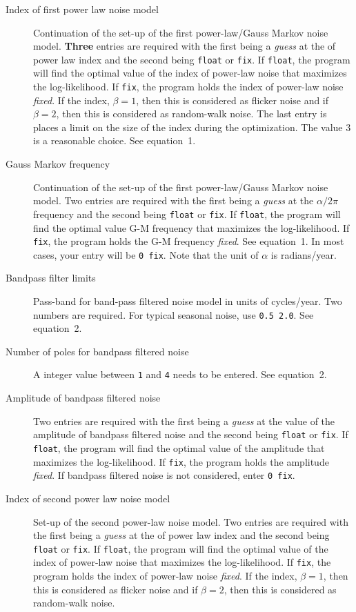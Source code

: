 \documentclass[12pt]{amsart}
\begin{document}
\begin{description}
\item[Index of first power law noise model] Continuation of the set-up of the first power-law/Gauss Markov noise model.
\textbf{Three} entries are required
with the first being a \textit{guess} at the of power law index and the second being \texttt{float} or \texttt{fix}.
If \texttt{float}, the program will find the optimal value of the index of power-law noise that maximizes the log-likelihood. If \texttt{fix},
the program holds the index of power-law noise \textit{fixed}.  If the index, $\beta=1$, then this is considered
as flicker noise and if $\beta=2$, then this is considered
as random-walk noise.  The last entry is places a limit on the size of the index during the optimization. The value
$3$ is a reasonable choice. See equation~1.

\item[Gauss Markov frequency] Continuation of the set-up of the first power-law/Gauss Markov noise model.
Two entries are required
with the first being a \textit{guess} at the ${\alpha}/{2{\pi}}$ frequency and the second being \texttt{float} or \texttt{fix}.
If \texttt{float}, the program will find the optimal value G-M frequency that maximizes the log-likelihood. If \texttt{fix},
the program holds the G-M frequency \textit{fixed}.   See equation~1. In most cases, your entry will be \texttt{0 fix}.
Note that the unit of ${\alpha}$ is radians/year.

\item[Bandpass filter limits] Pass-band for band-pass filtered noise model in units of cycles/year. Two numbers are
required. For typical seasonal noise, use \texttt{0.5 2.0}.  See equation~2.

\item[Number of poles for bandpass filtered noise] A integer value between \texttt{1} and \texttt{4} needs to be entered. See equation~2.

\item[Amplitude of bandpass filtered noise] Two entries are required
with the first being a \textit{guess} at the value of the amplitude of bandpass filtered noise and the second being \texttt{float} or \texttt{fix}.
If \texttt{float}, the program will find the optimal value of the amplitude  that maximizes the log-likelihood. If \texttt{fix},
the program holds the amplitude  \textit{fixed}.  If bandpass filtered noise is not considered, enter \texttt{0 fix}.

\item[Index of second power law noise model] Set-up of the second power-law noise model.
Two entries are required
with the first being a \textit{guess} at the of power law index and the second being \texttt{float} or \texttt{fix}.
If \texttt{float}, the program will find the optimal value of the index of power-law noise that maximizes the log-likelihood. If \texttt{fix},
the program holds the index of power-law noise \textit{fixed}.  If the index, $\beta=1$, then this is considered
as flicker noise and if $\beta=2$, then this is considered
as random-walk noise.


\end{description}
\end{document}
